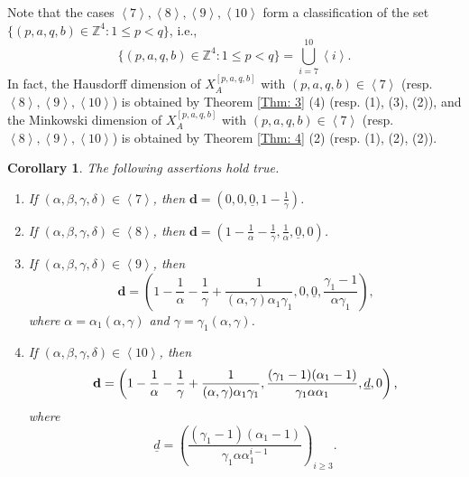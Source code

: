 \documentclass{amsart}
\newtheorem{corollary}[theorem]{Corollary}
\theoremstyle{definition}
\numberwithin{equation}{section}%
\begin{document}
Note that the cases $\left\langle 7\right\rangle, \left\langle 8\right\rangle,\left\langle 9\right\rangle,\left\langle 10\right\rangle$ form a classification of the set $\{(p,a,q,b)\in \mathbb{Z}^4 :  1\leq p <q\}$, i.e.,
\begin{equation*}
    \{(p,a,q,b)\in \mathbb{Z}^4 :  1\leq p <q\}=\bigcup_{i=7}^{10} \left\langle i\right\rangle.
\end{equation*}
In fact, the Hausdorff dimension of $X_A^{[p,a,q,b]}$ with $(p,a,q,b)\in \left\langle 7\right\rangle$ (resp. $\left\langle 8\right\rangle, \left\langle 9\right\rangle, \left\langle 10\right\rangle$) is obtained by Theorem \ref{Thm: 3} (4) (resp. (1), (3), (2)), and the Minkowski dimension of $X_A^{[p,a,q,b]}$ with $(p,a,q,b)\in \left\langle 7\right\rangle$ (resp. $\left\langle 8\right\rangle, \left\langle 9\right\rangle, \left\langle 10\right\rangle$) is obtained by Theorem \ref{Thm: 4} (2) (resp. (1), (2), (2)). 
\begin{corollary}\label{Cor: 1}
The following assertions hold true.

\begin{enumerate}
\item If $(\alpha ,\beta ,\gamma ,\delta )\in \left\langle 7\right\rangle $, then $\mathbf{d}=(0,0,\underline{0},1-\frac{1}{\gamma })$.

\item If $(\alpha ,\beta ,\gamma ,\delta )\in \left\langle 8\right\rangle $, then $\mathbf{d}=(1-\frac{1}{\alpha }-\frac{1}{\gamma },\frac{1}{\alpha },\underline{0},0)$.

\item If $(\alpha ,\beta ,\gamma ,\delta )\in \left\langle 9\right\rangle $,
then 
\[
\mathbf{d}=\left( 1-\frac{1}{\alpha }-\frac{1}{\gamma }+\frac{1}{(\alpha
,\gamma )\alpha _{1}\gamma _{1}},0,\underline{0},\frac{\gamma _{1}-1}{\alpha
\gamma _{1}}\right) \text{,} 
\]
where $\alpha=\alpha_1(\alpha ,\gamma )$ and $\gamma=\gamma_1 (\alpha ,\gamma )$.

\item If $(\alpha ,\beta ,\gamma ,\delta )\in \left\langle 10\right\rangle $, then 
\[
\mathbf{d}=\left( 1-\frac{1}{\alpha }-\frac{1}{\gamma }+\frac{1}{(\alpha
,\gamma )\alpha _{1}\gamma _{1}},\frac{(\gamma _{1}-1)(\alpha _{1}-1)}{%
\gamma _{1}\alpha \alpha _{1}},\underline{d},0\right) \text{,} 
\]
where 
\[
\underline{d}=\left( \frac{(\gamma _{1}-1)(\alpha_{1}-1)}{\gamma_{1}\alpha\alpha_{1}^{i-1}}\right)_{i\geq 3}
\text{.} 
\]
\end{enumerate}
\end{corollary}
\end{document}
